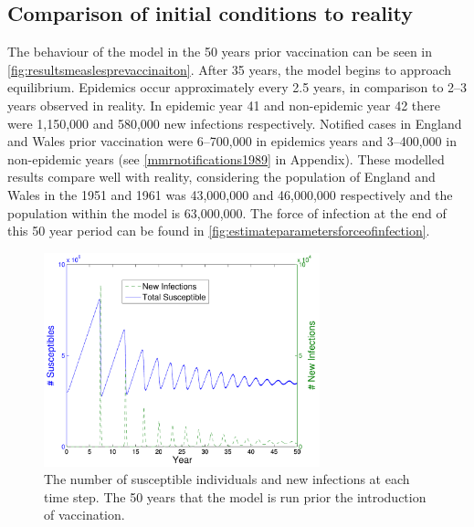\documentclass[a4paper,11pt] {scrartcl}
\begin{document}
\subsection{Comparison of initial conditions to reality}
\label{subsec:resultscomparison}
The behaviour of the model in the 50 years prior vaccination can be seen in \autoref{fig:resultsmeaslesprevaccinaiton}. After 35 years, the model begins to approach equilibrium. Epidemics occur approximately every 2.5 years, in comparison to 2--3 years observed in reality. In epidemic year 41 and non-epidemic year 42 there were 1,150,000 and 580,000 new infections respectively. Notified cases in England and Wales prior vaccination were 6--700,000 in epidemics years and 3--400,000 in non-epidemic years (see \autoref{mmrnotifications1989} in Appendix). These modelled results compare well with reality, considering the population of England and Wales in the 1951 and 1961 was 43,000,000 and 46,000,000 respectively\cite{census1951,census1961} and the population within the model is 63,000,000. The force of infection at the end of this 50 year period can be found in \autoref{fig:estimateparametersforceofinfection}.
\begin{figure}[h]
	\centering
	\includegraphics[width=80mm]{measlesprevaccination}
	\caption{The number of susceptible individuals and new infections at each time step. The 50 years that the model is run prior the introduction of vaccination.}
	\label{fig:resultsmeaslesprevaccinaiton}
\end{figure}
\end{document}
